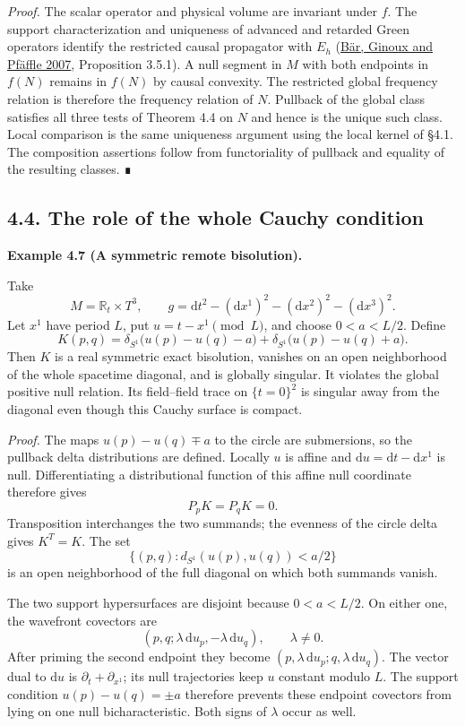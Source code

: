 \documentclass[
  english,
  11pt,
  reqno]{amsart}
\makeatletter
\newcommand{\paperdisplaynext}{%
  \let\paper@savedstartsection\@startsection
  \def\@startsection##1##2##3##4##5##6{%
    \let\@startsection\paper@savedstartsection
    \@tempskipa ##5\relax
    \ifdim\@tempskipa<\z@
      \def\paper@afterskip{.35\baselineskip}%
    \else
      \def\paper@afterskip{##5}%
    \fi
    \@startsection{##1}{##2}{##3}{##4}{\paper@afterskip}{##6}}}
\newcommand{\paperdisplaysection}{\paperdisplaynext\subsection}
\newcommand{\pandocstatementheading}[1]{%
  \par\if@nobreak\else
    \addpenalty{\@beginparpenalty}%
    \addvspace{.5\baselineskip plus .2\baselineskip minus .2\baselineskip}%
  \fi
  {\normalfont\bfseries #1\par}%
  \nobreak\@afterindenttrue\@afterheading
}
\makeatother
\begin{document}
\emph{Proof.} The scalar operator and physical volume are invariant
under \(f\). The support characterization and uniqueness of advanced and
retarded Green operators identify the restricted causal propagator with
\(E_h\) (\hyperref[ref-BarGinouxPfaeffle2007]{Bär, Ginoux and Pfäffle
2007}, Proposition 3.5.1). A null segment in \(M\) with both endpoints
in \(f(N)\) remains in \(f(N)\) by causal convexity. The restricted
global frequency relation is therefore the frequency relation of \(N\).
Pullback of the global class satisfies all three tests of Theorem 4.4 on
\(N\) and hence is the unique such class. Local comparison is the same
uniqueness argument using the local kernel of §4.1. The composition
assertions follow from functoriality of pullback and equality of the
resulting classes. ∎

\protect{}\label{sec:whole-cauchy-condition}
\paperdisplaysection{4.4. The role of the whole Cauchy
condition}\label{the-role-of-the-whole-cauchy-condition}
\pandocstatementheading{\protect{}\label{ex:torus-remote-bisolution}Example 4.7 (A symmetric remote bisolution).}

Take \[
M=\mathbb R_t\times T^3,\qquad
g=\mathrm dt^2-(\mathrm dx^1)^2-(\mathrm dx^2)^2-(\mathrm dx^3)^2.
\] Let \(x^1\) have period \(L\), put \(u=t-x^1\pmod L\), and choose
\(0<a<L/2\). Define \[
K(p,q)=
\delta_{S^1}\bigl(u(p)-u(q)-a\bigr)
+\delta_{S^1}\bigl(u(p)-u(q)+a\bigr).
\] Then \(K\) is a real symmetric exact bisolution, vanishes on an open
neighborhood of the whole spacetime diagonal, and is globally singular.
It violates the global positive null relation. Its field--field trace on
\(\{t=0\}^2\) is singular away from the diagonal even though this Cauchy
surface is compact.

\emph{Proof.} The maps \(u(p)-u(q)\mp a\) to the circle are submersions,
so the pullback delta distributions are defined. Locally \(u\) is affine
and \(\mathrm du=\mathrm dt-\mathrm dx^1\) is null. Differentiating a
distributional function of this affine null coordinate therefore gives
\[
P_pK=P_qK=0.
\] Transposition interchanges the two summands; the evenness of the
circle delta gives \(K^T=K\). The set \[
\{(p,q):d_{S^1}(u(p),u(q))<a/2\}
\] is an open neighborhood of the full diagonal on which both summands
vanish.

The two support hypersurfaces are disjoint because \(0<a<L/2\). On
either one, the wavefront covectors are \[
(p,q;\lambda\,\mathrm du_p,-\lambda\,\mathrm du_q),
\qquad\lambda\ne0.
\] After priming the second endpoint they become
\((p,\lambda\,\mathrm du_p;q,\lambda\,\mathrm du_q)\). The vector dual
to \(\mathrm du\) is \(\partial_t+\partial_{x^1}\); its null
trajectories keep \(u\) constant modulo \(L\). The support condition
\(u(p)-u(q)=\pm a\) therefore prevents these endpoint covectors from
lying on one null bicharacteristic. Both signs of \(\lambda\) occur as
well.
\end{document}
